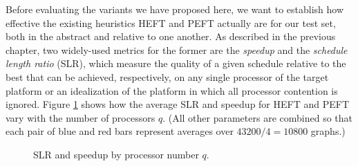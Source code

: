 \documentclass[12pt]{article}
\begin{document}
Before evaluating the variants we have proposed here, we want to establish how effective the existing heuristics HEFT and PEFT actually are for our test set, both in the abstract and relative to one another. As described in the previous chapter, two widely-used metrics for the former are the {\em speedup} and the {\em schedule length ratio} (SLR), which measure the quality of a given schedule relative to the best that can be achieved, respectively, on any single processor of the target platform or an idealization of the platform in which all processor contention is ignored. Figure \ref{plot.bench_slr_speedup} shows how the average SLR and speedup for HEFT and PEFT vary with the number of processors $q$. (All other parameters are combined so that each pair of blue and red bars represent averages over $43200/4 = 10800$ graphs.)  

\begin{figure}
	\centering	
	\caption{SLR and speedup by processor number $q$.}	
	\label{plot.bench_slr_speedup} 
      \end{figure}
\end{document}
